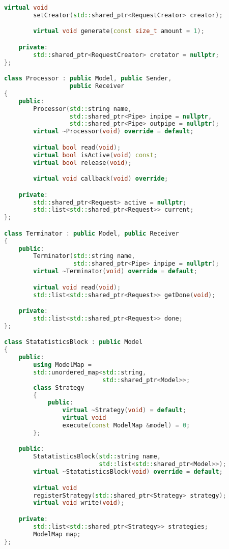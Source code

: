 \begin{lstlisting}[caption={Реализация элементов системы}, language=c++]
        virtual void
        setCreator(std::shared_ptr<RequestCreator> creator);

        virtual void generate(const size_t amount = 1);

    private:
        std::shared_ptr<RequestCreator> cretator = nullptr;
};

class Processor : public Model, public Sender,
                  public Receiver
{
    public:
        Processor(std::string name,
                  std::shared_ptr<Pipe> inpipe = nullptr,
                  std::shared_ptr<Pipe> outpipe = nullptr);
        virtual ~Processor(void) override = default;

        virtual bool read(void);
        virtual bool isActive(void) const;
        virtual bool release(void);

        virtual void callback(void) override;

    private:
        std::shared_ptr<Request> active = nullptr;
        std::list<std::shared_ptr<Request>> current;
};

class Terminator : public Model, public Receiver
{
    public:
        Terminator(std::string name,
                   std::shared_ptr<Pipe> inpipe = nullptr);
        virtual ~Terminator(void) override = default;

        virtual void read(void);
        std::list<std::shared_ptr<Request>> getDone(void);

    private:
        std::list<std::shared_ptr<Request>> done;
};

class StatatisticsBlock : public Model
{
    public:
        using ModelMap = 
        std::unordered_map<std::string,
                           std::shared_ptr<Model>>;
        class Strategy
        {
            public:
                virtual ~Strategy(void) = default;
                virtual void
                execute(const ModelMap &model) = 0;
        };

    public:
        StatatisticsBlock(std::string name,
                          std::list<std::shared_ptr<Model>>);
        virtual ~StatatisticsBlock(void) override = default;

        virtual void
        registerStrategy(std::shared_ptr<Strategy> strategy);
        virtual void write(void);

    private:
        std::list<std::shared_ptr<Strategy>> strategies;
        ModelMap map;
};
\end{lstlisting}

